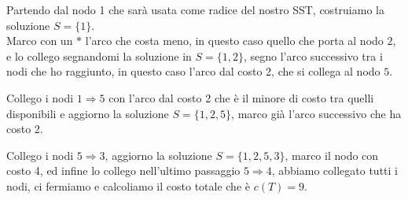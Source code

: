 \documentclass{article}
\begin{document}
Partendo dal nodo 1 che sarà usata come radice del nostro SST, costruiamo la soluzione $S=\{1\}$.\\
Marco con un $*$ l'arco che costa meno, in questo caso quello che porta al nodo $2$, e lo collego segnandomi la soluzione in $S=\{1,2\}$, segno l'arco successivo tra i nodi che ho raggiunto, in questo caso l'arco dal costo 2, che si collega al nodo $5$.

\begin{center}
\end{center}

Collego i nodi $1 \Rightarrow 5$ con l'arco dal costo 2 che è il minore di costo tra quelli disponibili e aggiorno la soluzione $S=\{1,2,5\}$, marco già l'arco successivo che ha costo 2.

\begin{center}
\end{center}

Collego i nodi $5 \Rightarrow 3$, aggiorno la soluzione  $S=\{1,2,5,3\}$, marco il nodo con costo 4, ed infine lo collego nell'ultimo passaggio $5 \Rightarrow 4$, abbiamo collegato tutti i nodi, ci fermiamo e calcoliamo il costo totale che è $c(T)=9$.

\begin{center}
\end{center}
\end{document}
